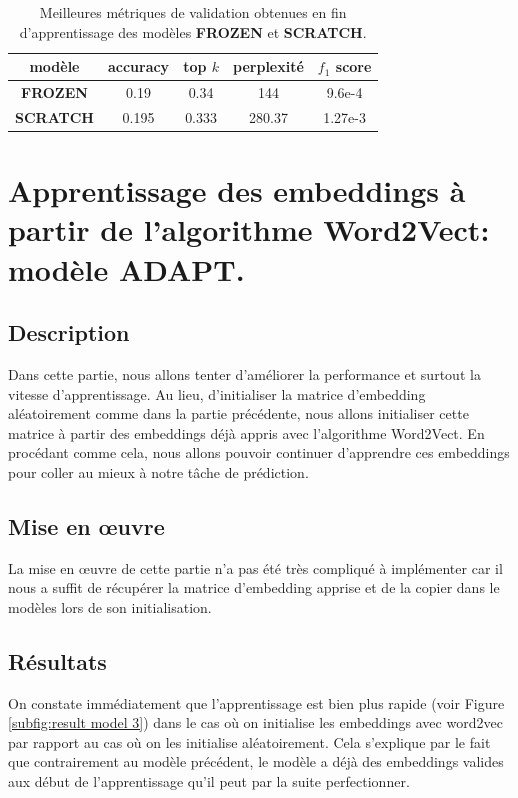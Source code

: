 \documentclass[a4paper]{article}
\begin{document}
\begin{table}
    \centering
    \begin{tabular}{|c|c|c|c|c|}
        \hline
        modèle & accuracy  & top $k$  & perplexité  & $f_1$ score \\
        \hline
        \textbf{FROZEN} & 0.19 & 0.34  & 144 & 9.6e-4 \\
        \hline
        \textbf{SCRATCH} & 0.195 & 0.333  & 280.37 & 1.27e-3 \\
        \hline
    \end{tabular}
    \caption{Meilleures métriques de validation obtenues en fin d'apprentissage des modèles \textbf{FROZEN} et \textbf{SCRATCH}.}
    \label{tab:metriques model2}
\end{table}


\section{Apprentissage des embeddings à partir de l'algorithme Word2Vect: modèle \textbf{ADAPT}.}

\subsection{Description}

Dans cette partie, nous allons tenter d'améliorer la performance et surtout la vitesse d'apprentissage. Au lieu,
d'initialiser la matrice d'embedding aléatoirement comme dans la partie précédente, nous allons initialiser cette 
matrice à partir des embeddings déjà appris avec l'algorithme Word2Vect. En procédant comme cela, nous allons pouvoir
continuer d'apprendre ces embeddings pour coller au mieux à notre tâche de prédiction.

\subsection{Mise en \oe uvre}

La mise en \oe uvre de cette partie n'a pas été très compliqué à implémenter car il nous a suffit de récupérer la matrice d'embedding apprise et de la copier dans le modèles lors de son initialisation.

\subsection{Résultats}

On constate immédiatement que l'apprentissage est bien plus rapide (voir Figure \ref{subfig:result model 3}) dans le cas où on initialise les embeddings avec word2vec par rapport au cas où on les initialise aléatoirement. Cela s'explique par le fait que contrairement au modèle précédent, le modèle a déjà des embeddings valides aux début de l'apprentissage qu'il peut par la suite perfectionner.
\end{document}
